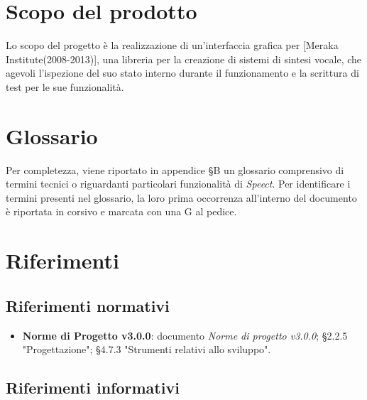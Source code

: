 \documentclass[openany,12pt,a4paper]{report}
\begin{document}
	\section{Scopo del prodotto}
	
	Lo scopo del progetto è la realizzazione di un’interfaccia grafica per  [Meraka Institute(2008-2013)], una libreria per la creazione di sistemi di sintesi vocale, che agevoli l’ispezione del suo stato interno durante il funzionamento e la scrittura di test per le sue funzionalità.


	\section{Glossario}
	
	Per completezza, viene riportato in appendice §B un glossario comprensivo di termini tecnici o riguardanti particolari funzionalità di \textit{Speect}. Per identificare i termini
	presenti nel glossario, la loro prima occorrenza all’interno del documento è riportata in corsivo e
	marcata con una G al pedice.

	\section{Riferimenti}
	
	\subsection*{Riferimenti normativi}
	
	\begin{itemize}
		\item \textbf{Norme di Progetto v3.0.0}: documento \textit{Norme di progetto v3.0.0};
		\subitem §2.2.5 "Progettazione";
		\subitem §4.7.3 "Strumenti relativi allo sviluppo".
	\end{itemize}
	
	\subsection*{Riferimenti informativi}
	
\end{document}
